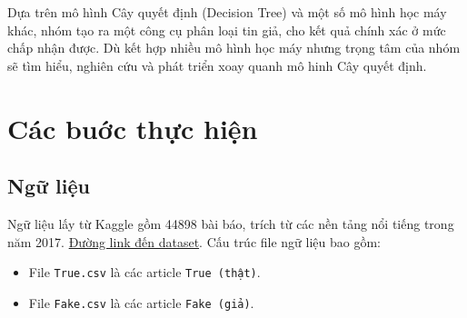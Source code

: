 \documentclass[12pt]{article}
\begin{document}
Dựa trên mô hình Cây quyết định (Decision Tree) và một số mô hình học máy khác, nhóm tạo ra một công cụ phân loại tin giả, cho kết quả chính xác ở mức chấp nhận được. Dù kết hợp nhiều mô hình học máy nhưng trọng tâm của nhóm sẽ tìm hiểu, nghiên cứu và phát triển xoay quanh mô hinh Cây quyết định.

\section{Các buớc thực hiện}
\subsection{Ngữ liệu}
Ngữ liệu lấy từ Kaggle gồm 44898 bài báo, trích từ các nền tảng nổi tiếng trong năm 2017. \href{https://www.kaggle.com/datasets/clmentbisaillon/fake-and-real-news-dataset}{Đường link đến dataset}. Cấu trúc file ngữ liệu bao gồm:
\begin{itemize}
\item File \texttt{True.csv} là các article \texttt{True (thật)}.
\item File \texttt{Fake.csv} là các article \texttt{Fake (giả)}.
\end{itemize}
\end{document}
